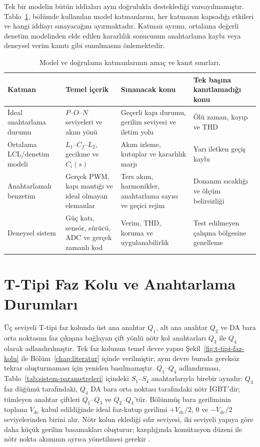Tek bir modelin bütün iddiaları aynı doğrulukla desteklediği varsayılmamıştır. Tablo~\ref{tab:model-katmanlari}, bölümde kullanılan model katmanlarını, her katmanın kapsadığı etkileri ve hangi iddiayı sınayacağını ayırmaktadır. Katman ayrımı, ortalama değerli denetim modelinden elde edilen kararlılık sonucunun anahtarlama kaybı veya deneysel verim kanıtı gibi sunulmasını önlemektedir.

\begin{table}[htbp]
  \centering
  \caption{Model ve doğrulama katmanlarının amaç ve kanıt sınırları.}
  \label{tab:model-katmanlari}
  \small
  \begin{tabularx}{\textwidth}{p{} p{} X X}
    \toprule
    Katman & Temel içerik & Sınanacak konu & Tek başına kanıtlamadığı konu \\
    \midrule
    İdeal anahtarlama durumu & $P$--$O$--$N$ seviyeleri ve akım yönü & Geçerli kapı durumu, gerilim seviyesi ve iletim yolu & Ölü zaman, kayıp ve THD \\
    Ortalama LCL/denetim modeli & $L_1$--$C_f$--$L_2$, gecikme ve $C_i(s)$ & Akım izleme, kutuplar ve kararlılık marjı & Yarı iletken geçiş kaybı \\
    Anahtarlamalı benzetim & Gerçek PWM, kapı mantığı ve ideal olmayan elemanlar & Ters akım, harmonikler, anahtarlama sayısı ve geçici rejim & Donanım sıcaklığı ve ölçüm belirsizliği \\
    Deneysel sistem & Güç katı, sensör, sürücü, ADC ve gerçek zamanlı kod & Verim, THD, koruma ve uygulanabilirlik & Test edilmeyen çalışma bölgesine genelleme \\
    \bottomrule
  \end{tabularx}
\end{table}

\section{T-Tipi Faz Kolu ve Anahtarlama Durumları}

Üç seviyeli T-tipi faz kolunda üst ana anahtar $Q_1$, alt ana anahtar $Q_2$ ve DA bara orta noktasını faz çıkışına bağlayan çift yönlü nötr kol anahtarları $Q_3$ ile $Q_4$ olarak adlandırılmıştır. Tek faz kolunun temel devre yapısı Şekil~\ref{fig:t-tipi-faz-kolu} ile Bölüm~\ref{chap:literatur} içinde verilmiştir; aynı devre burada gereksiz tekrar oluşturmaması için yeniden basılmamıştır. $Q_1$--$Q_4$ adlandırması, Tablo~\ref{tab:sistem-parametreleri} içindeki $S_1$--$S_4$ anahtarlarıyla birebir aynıdır: $Q_3$ faz düğümü tarafındaki, $Q_4$ DA bara orta noktası tarafındaki nötr IGBT'dir; tümleyen anahtar çiftleri $Q_1$--$Q_3$ ve $Q_2$--$Q_4$'tür. Bölünmüş bara geriliminin toplamı $V_{\mathrm{dc}}$ kabul edildiğinde ideal faz-kutup gerilimi $+V_{\mathrm{dc}}/2$, $0$ ve $-V_{\mathrm{dc}}/2$ seviyelerinden birini alır. Nötr kolun eklediği sıfır seviyesi, iki seviyeli yapıya göre daha küçük gerilim basamakları oluşturur; karşılığında komütasyon düzeni ile nötr nokta akımının ayrıca yönetilmesi gerekir \citep{Schweizer2013,Wang2020}.


